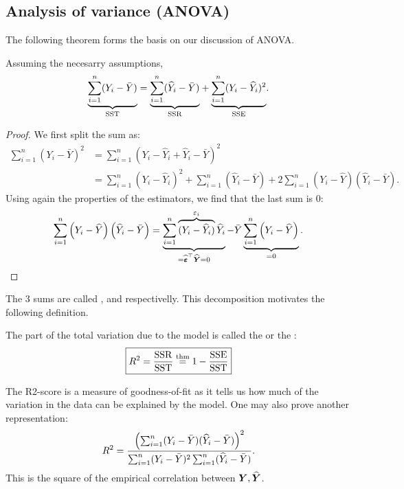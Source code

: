 \subsection{Analysis of variance (ANOVA)}
The following theorem forms the basis on our discussion of ANOVA. 
\begin{theorem} \label{thm:ANOVA}
    Assuming the necesarry assumptions, 
    $$
    \underset{\mathrm{SST}}{\underbrace{
        \sum_{i=1}^n (Y_i - \bar{Y})}} = 
    \underset{\mathrm{SSR}}{\underbrace{
        \sum_{i=1}^n (\widehat{Y}_i - \bar{Y})}} + 
    \underset{\mathrm{SSE}}{\underbrace{
        \sum_{i=1}^n (Y_i - \widehat{Y}_i)^2}}. 
    $$
\end{theorem}
\begin{proof}
    We first split the sum as:
    \begin{align*}
        \sum_{i=1}^{n}\left(Y_{i}-\bar{Y}\right)^{2}
        &=\sum_{i=1}^{n}\left(Y_{i}-\hat{Y}_{i}+\hat{Y}_{i}-\bar{Y}\right)^{2}
        \\&= \sum_{i=1}^{n}\left(Y_{i}-\hat{Y}_{i}\right)^{2}+\sum_{i=1}^{n}\left(\hat{Y}_{i}-\bar{Y}\right) 
        +2{\sum_{i=1}^{n}\left(Y_{i}-\hat{Y}\right)\left(\hat{Y}_{i}-\bar{Y}\right)}.
    \end{align*}
    Using again the properties of the estimators, we find that the last sum is $0$:
    $$
        \sum_{i=1}^{n}\left(Y_{i}-\widehat{Y}\right)\left(\widehat{Y}_{i}-\bar{Y}\right)
        =
        \underbrace{\sum_{i=1}^{n} \overbrace{(Y_i-\widehat{Y}_i)}^{\varepsilon_i}\widehat{Y}_{i}}_{=\widehat{\boldsymbol{\varepsilon}}^\top\widehat{\boldsymbol{Y}}=0}
        -\bar{Y}\underbrace{\sum_{i=1}^{n}\left(Y_{i}-\widehat{Y}\right)}_{=0}.
    $$
\end{proof}
The 3 sums are called ,  and  respectivelly. 
This decomposition motivates the following definition. 
\begin{definition}
    The part of the total variation due to the model is called the  or the :
    \begin{equation}
        \boxed{
            R^2 = \frac{\mathrm{SSR}}{\mathrm{SST}} \overset{\mathrm{thm}} = 1 - \frac{\mathrm{SSE}}{\mathrm{SST}}}        
    \end{equation}
\end{definition}
The R2-score is a measure of goodness-of-fit as it tells us how much of the variation in the data can be explained by the model. One may also prove another representation:
$$
    R^2 = \frac{\left( \sum_{i=1}^n(Y_i-\bar{Y})(\widehat{Y}_i-\bar{Y}) \right)^2}{\sum_{i=1}^n(Y_i-\bar{Y})^2\sum_{i=1}^n(\widehat{Y}_i-\bar{Y})}.
$$
This is the square of the empirical correlation between $\boldsymbol{Y}, \widehat{\boldsymbol{Y}}$.


